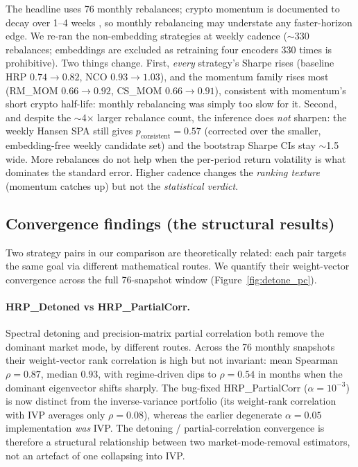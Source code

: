 \documentclass[11pt,a4paper]{article}
\begin{document}
The headline uses 76 monthly rebalances; crypto momentum is documented
to decay over 1--4 weeks \citep{liu2022cryptofactors}, so monthly
rebalancing may understate any faster-horizon edge. We re-ran the
non-embedding strategies at weekly cadence ($\sim$330 rebalances;
embeddings are excluded as retraining four encoders 330 times is
prohibitive). Two things change. First, \emph{every} strategy's Sharpe
rises (baseline HRP $0.74\to0.82$, NCO $0.93\to1.03$), and the momentum
family rises most (RM\_MOM $0.66\to0.92$, CS\_MOM $0.66\to0.91$),
consistent with momentum's short crypto half-life: monthly rebalancing
was simply too slow for it. Second, and despite the $\sim$4$\times$
larger rebalance count, the inference does \emph{not} sharpen: the
weekly Hansen SPA still gives $p_{\text{consistent}}=0.57$ (corrected
over the smaller, embedding-free weekly candidate set) and the
bootstrap Sharpe CIs stay $\sim$1.5 wide. More rebalances do not help
when the per-period return volatility is what dominates the standard
error. Higher cadence changes the \emph{ranking texture} (momentum
catches up) but not the \emph{statistical verdict}.

\subsection{Convergence findings (the structural results)}
\label{sec:results-convergence}

Two strategy pairs in our comparison are theoretically related: each
pair targets the same goal via different mathematical routes. We
quantify their weight-vector convergence across the full 76-snapshot
window (Figure~\ref{fig:detone_pc}).

\paragraph{HRP\_Detoned vs HRP\_PartialCorr.} Spectral detoning and
precision-matrix partial correlation both remove the dominant market
mode, by different routes. Across the 76 monthly snapshots their
weight-vector rank correlation is high but not invariant: mean Spearman
$\rho=0.87$, median $0.93$, with regime-driven dips to $\rho=0.54$ in
months when the dominant eigenvector shifts sharply. The bug-fixed
HRP\_PartialCorr ($\alpha=10^{-3}$) is now distinct from the
inverse-variance portfolio (its weight-rank correlation with IVP
averages only $\rho=0.08$), whereas the earlier degenerate
$\alpha=0.05$ implementation \emph{was} IVP. The detoning /
partial-correlation convergence is therefore a structural relationship
between two market-mode-removal estimators, not an artefact of one
collapsing into IVP.
\end{document}
